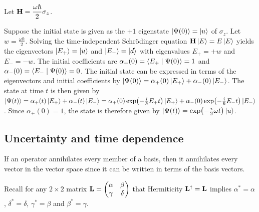 \begin{answer}
	Let $\displaystyle \mathbf{H} = \frac{\omega \hbar}{2} \sigma_z$.

	Suppose the initial state is given as the $+1$ eigenstate $\ket{\Psi(0)} = \ket{u}$ of $\sigma_z$.
	Let $w = \frac{\omega \hbar}{2}$.
	Solving the time-independent Schr\"{o}dinger equation $\mathbf{H} \ket{E} = E \ket{E}$ yields the eigenvectors $\ket{E_+} = \ket{u}$ and $\ket{E_-} = \ket{d}$ with eigenvalues $E_+ = +w$ and $E_- = -w$.
	The initial coefficients are $\alpha_+(0) = \braket{E_+ \mid \Psi(0)} = 1$ and $\alpha_-(0) = \braket{E_- \mid \Psi(0)} = 0$.
	The initial state can be expressed in terms of the eigenvectors and initial coefficients by $\ket{\Psi(0)} = \alpha_+(0) \ket{E_+} + \alpha_-(0) \ket{E_-}$.
	The state at time $t$ is then given by $\ket{\Psi(t)} = \alpha_+(t) \ket{E_+} + \alpha_-(t) \ket{E_-} = \alpha_+(0) \exp\!\left(-\frac{i}{\hbar} E_+ t\right) \ket{E_+} + \alpha_-(0) \exp\!\left(-\frac{i}{\hbar} E_- t\right) \ket{E_-}$.
	Since $\alpha_+(0) = 1$, the state is therefore given by $\ket{\Psi(t)} = \exp\!\left(-\frac{i}{2} \omega t\right) \ket{u}$.
\end{answer}

\subsection{Uncertainty and time dependence}

If an operator annihilates every member of a basis, then it annihilates every vector in the vector space since it can be written in terms of the basis vectors.

Recall for any $2 \times 2$ matrix $\mathbf{L} = \begin{pmatrix} \alpha & \beta \\ \gamma & \delta \end{pmatrix}$ that Hermiticity $\mathbf{L}^\dagger = \mathbf{L}$ implies $\alpha^* = \alpha$, $\delta^* = \delta$, $\gamma^* = \beta$ and $\beta^* = \gamma$.

